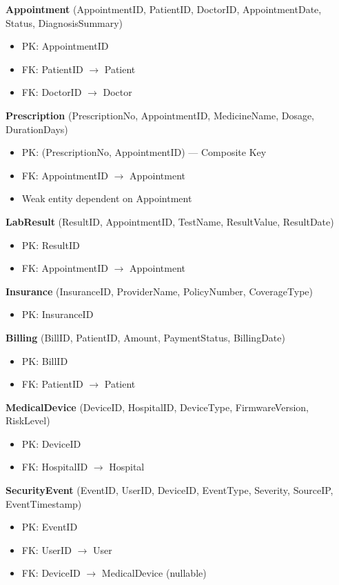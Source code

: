 \textbf{Appointment} (AppointmentID, PatientID, DoctorID, AppointmentDate, Status, DiagnosisSummary)
\begin{itemize}
    \item PK: AppointmentID
    \item FK: PatientID $\rightarrow$ Patient
    \item FK: DoctorID $\rightarrow$ Doctor
\end{itemize}

\textbf{Prescription} (PrescriptionNo, AppointmentID, MedicineName, Dosage, DurationDays)
\begin{itemize}
    \item PK: (PrescriptionNo, AppointmentID) — Composite Key
    \item FK: AppointmentID $\rightarrow$ Appointment
    \item Weak entity dependent on Appointment
\end{itemize}

\textbf{LabResult} (ResultID, AppointmentID, TestName, ResultValue, ResultDate)
\begin{itemize}
    \item PK: ResultID
    \item FK: AppointmentID $\rightarrow$ Appointment
\end{itemize}

\textbf{Insurance} (InsuranceID, ProviderName, PolicyNumber, CoverageType)
\begin{itemize}
    \item PK: InsuranceID
\end{itemize}

\textbf{Billing} (BillID, PatientID, Amount, PaymentStatus, BillingDate)
\begin{itemize}
    \item PK: BillID
    \item FK: PatientID $\rightarrow$ Patient
\end{itemize}

\textbf{MedicalDevice} (DeviceID, HospitalID, DeviceType, FirmwareVersion, RiskLevel)
\begin{itemize}
    \item PK: DeviceID
    \item FK: HospitalID $\rightarrow$ Hospital
\end{itemize}

\textbf{SecurityEvent} (EventID, UserID, DeviceID, EventType, Severity, SourceIP, EventTimestamp)
\begin{itemize}
    \item PK: EventID
    \item FK: UserID $\rightarrow$ User
    \item FK: DeviceID $\rightarrow$ MedicalDevice (nullable)
\end{itemize}

